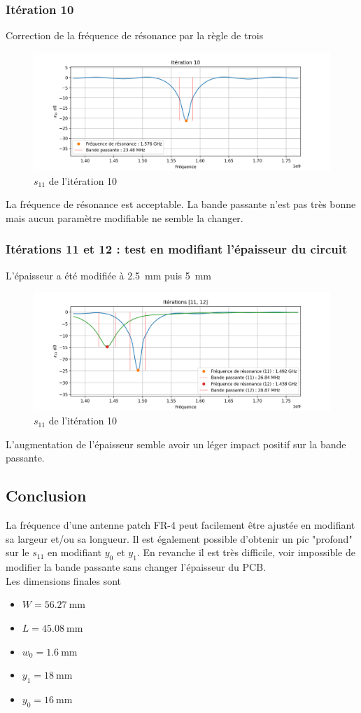 \documentclass[Deriaz_Traiber_Labo02.tex]{subfiles}
\begin{document}
\subsubsection{Itération 10}
Correction de la fréquence de résonance par la règle de trois
\begin{figure}[H]
\centering
\includegraphics[width=15cm]{../Calculs/run_id_fr4_10.png}
\caption[caption]{$s_{11}$ de l'itération 10}
\end{figure}
La fréquence de résonance est acceptable. La bande passante n'est pas très bonne mais aucun paramètre modifiable ne semble la changer.
\subsubsection{Itérations 11 et 12 : test en modifiant l'épaisseur du circuit}
L'épaisseur a été modifiée à \SI{2.5}{\milli\meter} puis \SI{5}{\milli\meter}
\begin{figure}[H]
\centering
\includegraphics[width=15cm]{../Calculs/run_id_fr4_1112.png}
\caption[caption]{$s_{11}$ de l'itération 10}
\end{figure}
L'augmentation de l'épaisseur semble avoir un léger impact positif sur la bande passante.
\subsection{Conclusion}
La fréquence d'une antenne patch FR-4 peut facilement être ajustée en modifiant sa largeur et/ou sa longueur. Il est également possible d'obtenir un pic "profond" sur le $s_{11}$ en modifiant $y_0$ et $y_1$. En revanche il est très difficile, voir impossible de modifier la bande passante sans changer l'épaisseur du PCB.\\
Les dimensions finales sont
\begin{itemize}
\item $W=\SI{56.27}{\milli\meter}$
\item $L=\SI{45.08}{\milli\meter}$
\item $w_0=\SI{1.6}{\milli\meter}$
\item $y_1=\SI{18}{\milli\meter}$
\item $y_0=\SI{16}{\milli\meter}$
\end{itemize}
\end{document}
